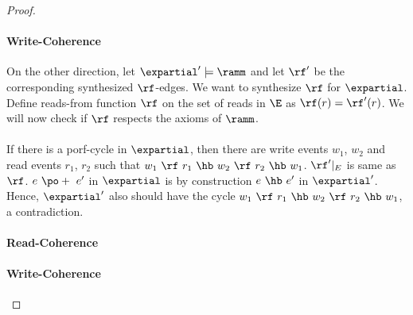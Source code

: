 \begin{proof}
 \paragraph*{Write-Coherence} 
 
 
 On the other direction,  let $\expartial' \models  \ramm$ and let $\rf'$ be the corresponding synthesized $\rf$-edges. We want to synthesize $\rf$ for $\expartial$.  Define reads-from function $\rf$ on the set of reads in $\E$ as $\rf(r)=\rf'(r)$. We will now check if $\rf$ respects the axioms of $\ramm$. 
 
 \paragraph*{\PORF{}} 
 
 
 If there is a porf-cycle in $\expartial$, then there are write events $w_1$,  $w_2$ and read events $r_1$, $r_2$ such that $w_1~\rf~r_1~\hb~w_2~\rf~r_2~\hb~w_1$. $\rf'|_E$ is same as $\rf$. $e~\po+~e'$ in $\expartial$ is by construction $e~\hb~e'$ in $\expartial'$. Hence, $\expartial'$ also should have the cycle  $w_1~\rf~r_1~\hb~w_2~\rf~r_2~\hb~w_1$, a contradiction.   
 
 \paragraph*{Read-Coherence}
 
 \paragraph*{Write-Coherence}
 
\end{proof}








